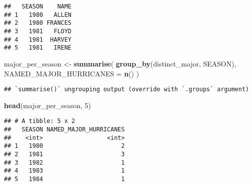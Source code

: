 \documentclass[
]{article}
\newenvironment{Shaded}{\begin{snugshade}}{\end{snugshade}}
\newcommand{\DataTypeTok}[1]{\textcolor[rgb]{0.13,0.29,0.53}{#1}}
\newcommand{\DecValTok}[1]{\textcolor[rgb]{0.00,0.00,0.81}{#1}}
\newcommand{\KeywordTok}[1]{\textcolor[rgb]{0.13,0.29,0.53}{\textbf{#1}}}
\newcommand{\NormalTok}[1]{#1}
\newcommand{\OperatorTok}[1]{\textcolor[rgb]{0.81,0.36,0.00}{\textbf{#1}}}
\newcommand{\OtherTok}[1]{\textcolor[rgb]{0.56,0.35,0.01}{#1}}
\newcommand{\StringTok}[1]{\textcolor[rgb]{0.31,0.60,0.02}{#1}}
\begin{document}
\begin{Shaded}
\end{Shaded}

\begin{verbatim}
##   SEASON    NAME
## 1   1980   ALLEN
## 2   1980 FRANCES
## 3   1981   FLOYD
## 4   1981  HARVEY
## 5   1981   IRENE
\end{verbatim}

\begin{Shaded}
\begin{Highlighting}[]
\NormalTok{major_per_season <-}\StringTok{ }\KeywordTok{summarise}\NormalTok{(}
  \KeywordTok{group_by}\NormalTok{(distinct_major, SEASON),}
  \DataTypeTok{NAMED_MAJOR_HURRICANES =} \KeywordTok{n}\NormalTok{()}
\NormalTok{)}
\end{Highlighting}
\end{Shaded}

\begin{verbatim}
## `summarise()` ungrouping output (override with `.groups` argument)
\end{verbatim}

\begin{Shaded}
\begin{Highlighting}[]
\KeywordTok{head}\NormalTok{(major_per_season, }\DecValTok{5}\NormalTok{)}
\end{Highlighting}
\end{Shaded}

\begin{verbatim}
## # A tibble: 5 x 2
##   SEASON NAMED_MAJOR_HURRICANES
##    <int>                  <int>
## 1   1980                      2
## 2   1981                      3
## 3   1982                      1
## 4   1983                      1
## 5   1984                      1
\end{verbatim}

\begin{Shaded}
\end{Shaded}
\end{document}
